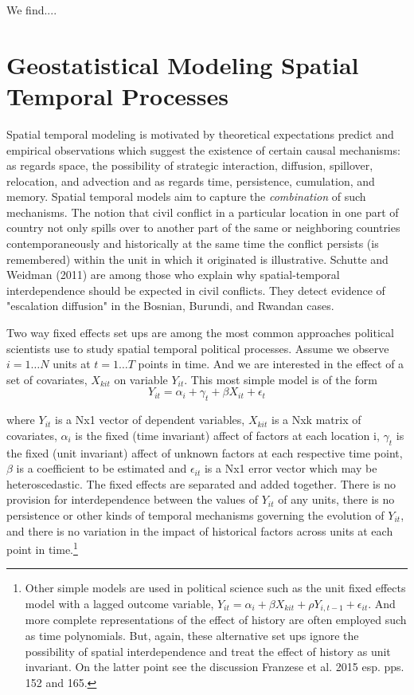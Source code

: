 \documentclass[12pt]{article}
\begin{document}
We find....

\section{Geostatistical Modeling Spatial Temporal Processes}

Spatial temporal modeling is motivated by theoretical expectations predict and empirical observations
which suggest the existence of certain causal mechanisms: as regards space, the possibility
of strategic interaction, diffusion, spillover, relocation, and advection and as regards time, persistence,
cumulation, and memory. Spatial temporal models aim to capture the \emph{combination} of
such mechanisms. The notion that civil conflict in a particular location in one part of country not only
spills over to another part of the same or neighboring countries contemporaneously and
historically at the same time the conflict persists (is remembered) within the unit in
which it originated is illustrative. Schutte and Weidman (2011) are among those who explain why
spatial-temporal interdependence should be expected in civil conflicts. They detect evidence
of "escalation diffusion" in the Bosnian, Burundi, and Rwandan cases.

Two way fixed effects set ups are among the most common approaches political scientists use
to study spatial temporal political processes. Assume we observe $i = 1 \dots N$ units at $t= 1 \dots T$ points
in time. And we are interested in the effect of a set of covariates, $X_{kit}$ on variable $Y_{it}$.
This most simple model is of the form
\begin{equation}
Y_{it} = \alpha_i + \gamma_t + \beta X_{it} + \epsilon_t
\end{equation}

where $Y_{it}$ is a Nx1 vector of dependent variables, $X_{kit}$ is a Nxk matrix of
covariates, $\alpha_i$ is the fixed (time invariant) affect of factors at each location i,
$\gamma_t$ is the fixed (unit invariant) affect of unknown factors at each respective
time point, $\beta$ is a coefficient to be estimated and $\epsilon_{it}$ is a Nx1 error
vector which may be heteroscedastic. The fixed effects are separated and added together.
There is no provision for interdependence between the values of $Y_{it}$ of any units,
there is no persistence or other kinds of temporal mechanisms governing the evolution
of $Y_{it}$, and there is no variation in the impact of historical factors across units at each
point in time.\footnote{Other simple models are used in political science such as the unit fixed
effects model with a lagged outcome variable, $Y_{it}= \alpha_i + \beta X_{kit} + \rho Y_{i, t-1} +
\epsilon_{it}$. And more complete representations of the effect of history are often employed
such as time polynomials. But, again, these alternative set ups ignore the possibility of
spatial interdependence and treat the effect of history as unit invariant. On the latter
point see the discussion Franzese et al. 2015 esp. pps. 152 and 165.}
\end{document}
